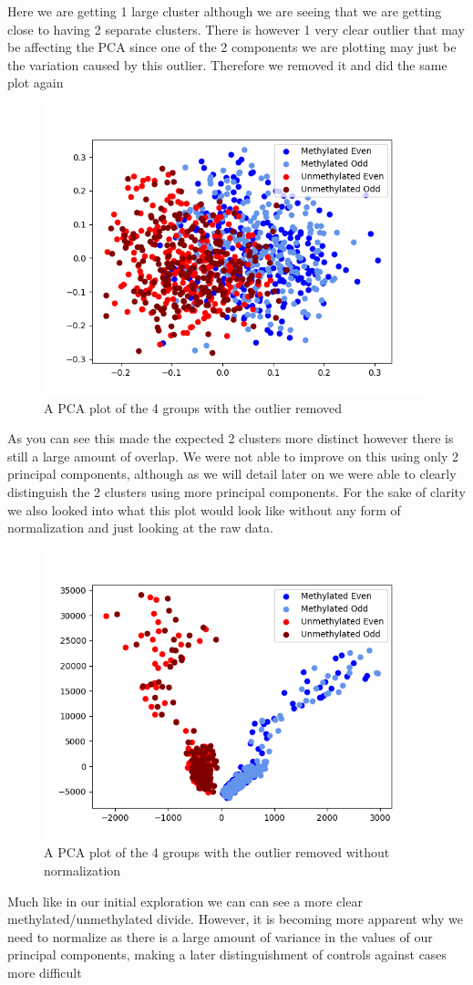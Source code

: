 Here we are getting 1 large cluster although we are seeing that we are getting close to having 2 separate clusters. There is however 1 very clear outlier that may be affecting the PCA since one of the 2 components we are plotting may just be the variation caused by this outlier. Therefore we removed it and did the same plot again

\begin{figure}[H]
	\centering
	\includegraphics[width=0.7\linewidth]{../../figures/all_healthy/all_healthy_outlier_removed.png}
	\caption{A PCA plot of the 4 groups with the outlier removed}
	\label{fig:allhealthy1}
\end{figure}

As you can see this made the expected 2 clusters more distinct however there is still a large amount of overlap. We were not able to improve on this using only 2 principal components, although as we will detail later on we were able to clearly distinguish the 2 clusters using more principal components. 
For the sake of clarity we also looked into what this plot would look like without any form of normalization and just looking at the raw data.

\begin{figure}[H]
	\centering
	\includegraphics[width=0.7\linewidth]{../../figures/all_healthy/all_healthy_outlier_removed_raw.png}
	\caption{A PCA plot of the 4 groups with the outlier removed without normalization}
	\label{fig:allhealthy2}
\end{figure}

Much like in our initial exploration we can can see a more clear methylated/unmethylated divide. However, it is becoming more apparent why we need to normalize as there is a large amount of variance in the values of our principal components, making a later distinguishment of controls against cases more difficult 
